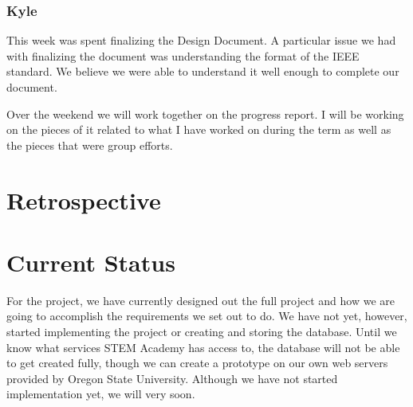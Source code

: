 \documentclass[letterpaper,10pt,serif, draftclsnofoot,onecolumn, compsoc, titlepage]{IEEEtran}
\begin{document}
\subsubsection{Kyle}
This week was spent finalizing the Design Document. A particular issue we had with finalizing the document was understanding the format of the IEEE standard. We believe we were able to understand it well enough to complete our document.

Over the weekend we will work together on the progress report. I will be working on the pieces of it related to what I have worked on during the term as well as the pieces that were group efforts.
\section{Retrospective}
\section{Current Status}
For the project, we have currently designed out the full project and how we are going to accomplish the requirements we set out to do.
We have not yet, however, started implementing the project or creating and storing the database.
Until we know what services STEM Academy has access to, the database will not be able to get created fully, though we can create a prototype on our own web servers provided by Oregon State University.
Although we have not started implementation yet, we will very soon.
\end{document}
